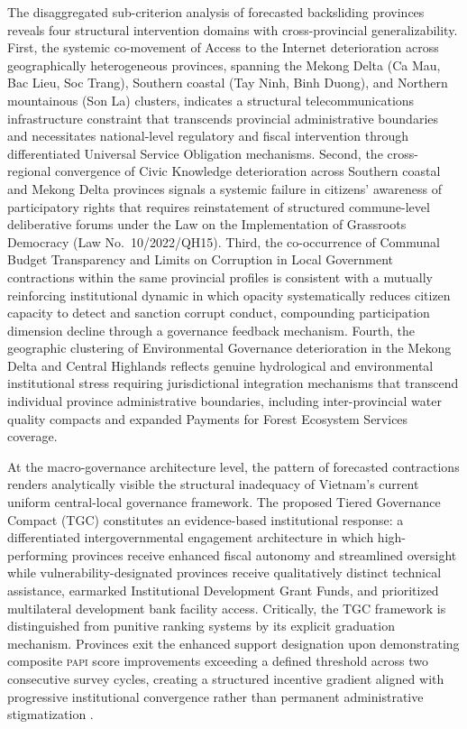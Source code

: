 \documentclass[12pt,a4paper]{article}
\newcommand{\PAPI}{\textsc{papi}\xspace}
\begin{document}
The disaggregated sub-criterion analysis of forecasted backsliding provinces reveals four structural intervention domains with cross-provincial generalizability. First, the systemic co-movement of Access to the Internet deterioration across geographically heterogeneous provinces, spanning the Mekong Delta (Ca Mau, Bac Lieu, Soc Trang), Southern coastal (Tay Ninh, Binh Duong), and Northern mountainous (Son La) clusters, indicates a structural telecommunications infrastructure constraint that transcends provincial administrative boundaries and necessitates national-level regulatory and fiscal intervention through differentiated Universal Service Obligation mechanisms. Second, the cross-regional convergence of Civic Knowledge deterioration across Southern coastal and Mekong Delta provinces signals a systemic failure in citizens' awareness of participatory rights that requires reinstatement of structured commune-level deliberative forums under the Law on the Implementation of Grassroots Democracy (Law No.\ 10/2022/QH15). Third, the co-occurrence of Communal Budget Transparency and Limits on Corruption in Local Government contractions within the same provincial profiles is consistent with a mutually reinforcing institutional dynamic in which opacity systematically reduces citizen capacity to detect and sanction corrupt conduct, compounding participation dimension decline through a governance feedback mechanism. Fourth, the geographic clustering of Environmental Governance deterioration in the Mekong Delta and Central Highlands reflects genuine hydrological and environmental institutional stress requiring jurisdictional integration mechanisms that transcend individual province administrative boundaries, including inter-provincial water quality compacts and expanded Payments for Forest Ecosystem Services coverage.

At the macro-governance architecture level, the pattern of forecasted contractions renders analytically visible the structural inadequacy of Vietnam's current uniform central-local governance framework. The proposed Tiered Governance Compact (TGC) constitutes an evidence-based institutional response: a differentiated intergovernmental engagement architecture in which high-performing provinces receive enhanced fiscal autonomy and streamlined oversight while vulnerability-designated provinces receive qualitatively distinct technical assistance, earmarked Institutional Development Grant Funds, and prioritized multilateral development bank facility access. Critically, the TGC framework is distinguished from punitive ranking systems by its explicit graduation mechanism. Provinces exit the enhanced support designation upon demonstrating composite \PAPI score improvements exceeding a defined threshold across two consecutive survey cycles, creating a structured incentive gradient aligned with progressive institutional convergence rather than permanent administrative stigmatization \citep{Malesky2011}.
\end{document}
